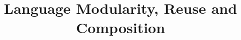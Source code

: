 \documentclass[10pt,nonatbib]{sigplanconf}
\title{Language Modularity, Reuse and Composition}
\begin{document}
\maketitle

\begin{abstract}
 
\end{abstract} 



 

\end{document}
